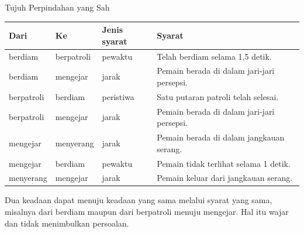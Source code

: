 \documentclass[aspectratio=169,10pt]{beamer}
\begin{document}
\begin{frame}{Tujuh Perpindahan yang Sah}
{\scriptsize
\renewcommand{\arraystretch}{1.12}
\begin{tabularx}{\textwidth}{@{}>{\raggedright\arraybackslash}p{2.35cm}
    >{\raggedright\arraybackslash}p{2.35cm}
    >{\raggedright\arraybackslash}p{1.95cm}
    >{\raggedright\arraybackslash}X@{}}
\toprule
\textbf{Dari} & \textbf{Ke} & \textbf{Jenis syarat} & \textbf{Syarat} \\
\midrule
berdiam & berpatroli & pewaktu & Telah berdiam selama 1,5 detik. \\
\addlinespace
berdiam & mengejar & jarak & Pemain berada di dalam jari-jari persepsi. \\
\addlinespace
berpatroli & berdiam & peristiwa & Satu putaran patroli telah selesai. \\
\addlinespace
berpatroli & mengejar & jarak & Pemain berada di dalam jari-jari persepsi. \\
\addlinespace
mengejar & menyerang & jarak & Pemain berada di dalam jangkauan serang. \\
\addlinespace
mengejar & berdiam & pewaktu & Pemain tidak terlihat selama 1 detik. \\
\addlinespace
menyerang & mengejar & jarak & Pemain keluar dari jangkauan serang. \\
\bottomrule
\end{tabularx}}
\vspace{0.10cm}
{\footnotesize\color{ubMuted}Dua keadaan dapat menuju keadaan yang sama melalui
syarat yang sama, misalnya dari berdiam maupun dari berpatroli menuju mengejar.
Hal itu wajar dan tidak menimbulkan persoalan.}
\end{frame}
\end{document}

